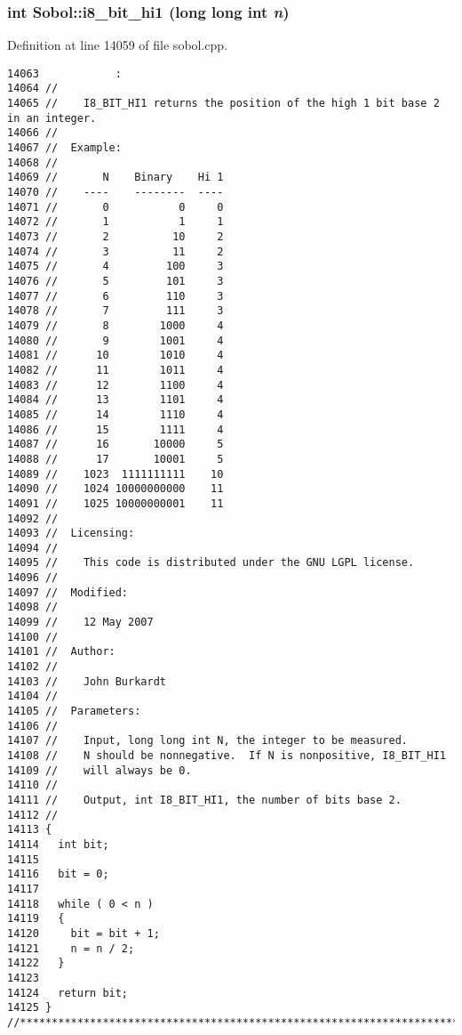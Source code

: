 \subsubsection{\setlength{\rightskip}{0pt plus 5cm}int Sobol::i8\_\-bit\_\-hi1 (long long int {\em n})}\label{namespaceSobol_9f0e3b32d9811d43c67204f3813db9b5}




Definition at line 14059 of file sobol.cpp.

\begin{Code}\begin{verbatim}14063            :
14064 //
14065 //    I8_BIT_HI1 returns the position of the high 1 bit base 2 in an integer.
14066 //
14067 //  Example:
14068 //
14069 //       N    Binary    Hi 1
14070 //    ----    --------  ----
14071 //       0           0     0
14072 //       1           1     1
14073 //       2          10     2
14074 //       3          11     2 
14075 //       4         100     3
14076 //       5         101     3
14077 //       6         110     3
14078 //       7         111     3
14079 //       8        1000     4
14080 //       9        1001     4
14081 //      10        1010     4
14082 //      11        1011     4
14083 //      12        1100     4
14084 //      13        1101     4
14085 //      14        1110     4
14086 //      15        1111     4
14087 //      16       10000     5
14088 //      17       10001     5
14089 //    1023  1111111111    10
14090 //    1024 10000000000    11
14091 //    1025 10000000001    11
14092 //
14093 //  Licensing:
14094 //
14095 //    This code is distributed under the GNU LGPL license. 
14096 //
14097 //  Modified:
14098 //
14099 //    12 May 2007
14100 //
14101 //  Author:
14102 //
14103 //    John Burkardt
14104 //
14105 //  Parameters:
14106 //
14107 //    Input, long long int N, the integer to be measured.
14108 //    N should be nonnegative.  If N is nonpositive, I8_BIT_HI1
14109 //    will always be 0.
14110 //
14111 //    Output, int I8_BIT_HI1, the number of bits base 2.
14112 //
14113 {
14114   int bit;
14115 
14116   bit = 0;
14117 
14118   while ( 0 < n )
14119   {
14120     bit = bit + 1;
14121     n = n / 2;
14122   }
14123 
14124   return bit;
14125 }
//****************************************************************************80
\end{verbatim}
\end{Code}


